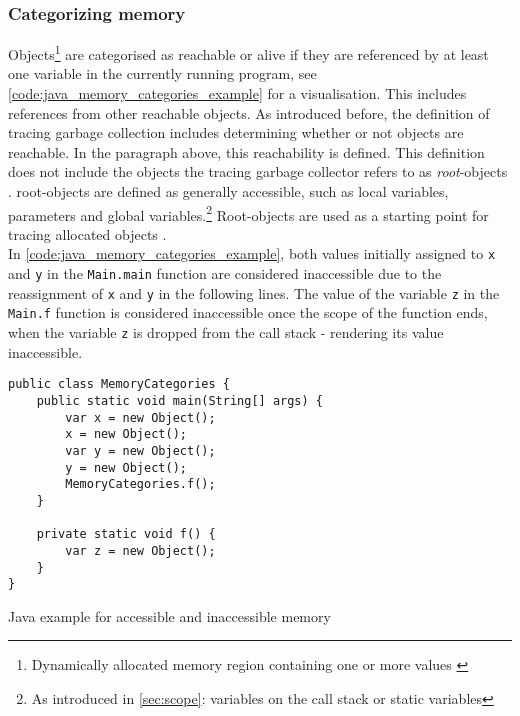 \subsubsection{Categorizing memory}
\label{sec:categorizing_memory}

Objects\footnote{Dynamically allocated memory region containing one or more
values \cite[Tracing Garbage Collection]{go_gcguide_2022}} are categorised as
reachable or alive if they are referenced by at least one variable in the
currently running program, see \autoref{code:java_memory_categories_example}
for a visualisation. This includes references from other reachable objects. As
introduced before, the definition of tracing garbage collection includes
determining whether or not objects are reachable. In the paragraph above, this
reachability is defined. This definition does not include the objects the
tracing garbage collector refers to as \textit{root}-objects
\cite[Preliminaries: Heap Depth and Tracing]{tracing-gc_barabash_2010}.
root-objects are defined as generally accessible, such as local variables,
parameters and global variables.\footnote{As introduced in \autoref{sec:scope}:
variables on the call stack or static variables} Root-objects are used as a
starting point for tracing allocated objects \cite[Preliminaries: Heap Depth
and Tracing]{tracing-gc_barabash_2010}.\\

In \autoref{code:java_memory_categories_example}, both values initially
assigned to \texttt{x} and \texttt{y} in the \texttt{Main.main} function are
considered inaccessible due to the reassignment of \texttt{x} and \texttt{y}
in the following lines. The value of the variable \texttt{z} in the
\texttt{Main.f} function is considered inaccessible once the scope of the
function ends, when the variable \texttt{z} is dropped from the call stack -
rendering its value inaccessible. 

\begin{listing}[H] 
    \begin{verbatim} 
public class MemoryCategories {
    public static void main(String[] args) {
        var x = new Object();
        x = new Object();
        var y = new Object();
        y = new Object();
        MemoryCategories.f();
    }

    private static void f() {
        var z = new Object();
    }
}
    \end{verbatim}
    \caption{Java example for accessible and inaccessible memory}
    \label{code:java_memory_categories_example}
\end{listing}


